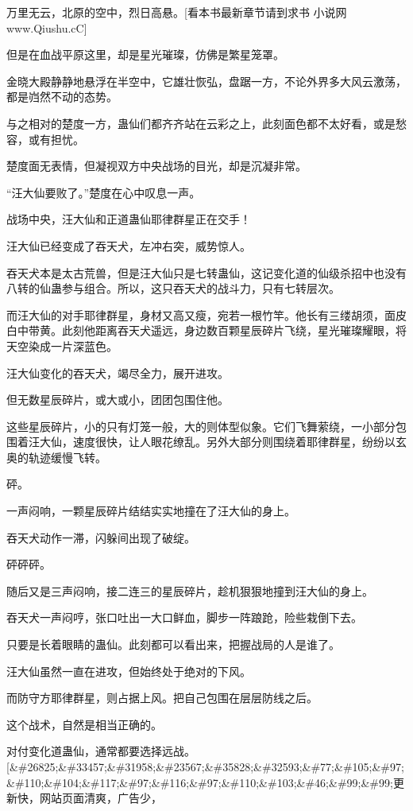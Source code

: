 
\begin{this_body}

万里无云，北原的空中，烈日高悬。[看本书最新章节请到求书 小说网www.Qiushu.cC]

但是在血战平原这里，却是星光璀璨，仿佛是繁星笼罩。

金晓大殿静静地悬浮在半空中，它雄壮恢弘，盘踞一方，不论外界多大风云激荡，都是岿然不动的态势。

与之相对的楚度一方，蛊仙们都齐齐站在云彩之上，此刻面色都不太好看，或是愁容，或有担忧。

楚度面无表情，但凝视双方中央战场的目光，却是沉凝非常。

“汪大仙要败了。”楚度在心中叹息一声。

战场中央，汪大仙和正道蛊仙耶律群星正在交手！

汪大仙已经变成了吞天犬，左冲右突，威势惊人。

吞天犬本是太古荒兽，但是汪大仙只是七转蛊仙，这记变化道的仙级杀招中也没有八转的仙蛊参与组合。所以，这只吞天犬的战斗力，只有七转层次。

而汪大仙的对手耶律群星，身材又高又瘦，宛若一根竹竿。他长有三缕胡须，面皮白中带黄。此刻他距离吞天犬遥远，身边数百颗星辰碎片飞绕，星光璀璨耀眼，将天空染成一片深蓝色。

汪大仙变化的吞天犬，竭尽全力，展开进攻。

但无数星辰碎片，或大或小，团团包围住他。

这些星辰碎片，小的只有灯笼一般，大的则体型似象。它们飞舞萦绕，一小部分包围着汪大仙，速度很快，让人眼花缭乱。另外大部分则围绕着耶律群星，纷纷以玄奥的轨迹缓慢飞转。

砰。

一声闷响，一颗星辰碎片结结实实地撞在了汪大仙的身上。

吞天犬动作一滞，闪躲间出现了破绽。

砰砰砰。

随后又是三声闷响，接二连三的星辰碎片，趁机狠狠地撞到汪大仙的身上。

吞天犬一声闷哼，张口吐出一大口鲜血，脚步一阵踉跄，险些栽倒下去。

只要是长着眼睛的蛊仙。此刻都可以看出来，把握战局的人是谁了。

汪大仙虽然一直在进攻，但始终处于绝对的下风。

而防守方耶律群星，则占据上风。把自己包围在层层防线之后。

这个战术，自然是相当正确的。

对付变化道蛊仙，通常都要选择远战。[\&\#26825;\&\#33457;\&\#31958;\&\#23567;\&\#35828;\&\#32593;\&\#77;\&\#105;\&\#97;\&\#110;\&\#104;\&\#117;\&\#97;\&\#116;\&\#97;\&\#110;\&\#103;\&\#46;\&\#99;\&\#99;更新快，网站页面清爽，广告少，


\end{this_body}
